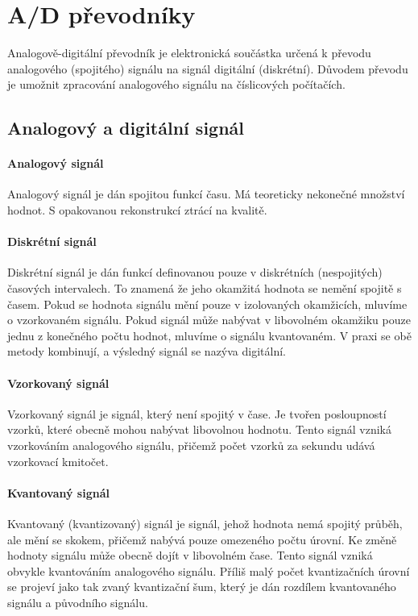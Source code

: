 
\section{A/D převodníky}
Analogově-digitální převodník je elektronická součástka určená k převodu analogového (spojitého) signálu na signál digitální (diskrétní). Důvodem převodu je umožnit zpracování analogového signálu na číslicových počítačích.

\subsection{Analogový a digitální signál}

\paragraph{Analogový signál}
Analogový signál je dán spojitou funkcí času. Má teoreticky nekonečné množství hodnot. S opakovanou rekonstrukcí ztrácí na kvalitě.

\paragraph{Diskrétní signál}
Diskrétní signál je dán funkcí definovanou pouze v diskrétních (nespojitých) časových intervalech. To znamená že jeho okamžitá hodnota se nemění spojitě s časem. Pokud se hodnota signálu mění pouze v izolovaných okamžicích, mluvíme o vzorkovaném signálu. Pokud signál může nabývat v libovolném okamžiku pouze jednu z konečného počtu hodnot, mluvíme o signálu kvantovaném. V praxi se obě metody kombinují, a výsledný signál se nazýva digitální.

\paragraph{Vzorkovaný signál}
Vzorkovaný signál je signál, který není spojitý v čase. Je tvořen posloupností vzorků, které obecně mohou nabývat libovolnou hodnotu. Tento signál vzniká vzorkováním analogového signálu, přičemž počet vzorků za sekundu udává vzorkovací kmitočet. 
\begin{figure}[htbp]
\centering

\end{figure}
\paragraph{Kvantovaný signál}
Kvantovaný (kvantizovaný) signál je signál, jehož hodnota nemá spojitý průběh, ale mění se skokem, přičemž nabývá pouze omezeného počtu úrovní. Ke změně hodnoty signálu může obecně dojít v libovolném čase. Tento signál vzniká obvykle kvantováním analogového signálu.  Příliš malý počet kvantizačních úrovní se projeví jako tak zvaný kvantizační šum, který je dán rozdílem kvantovaného signálu a původního signálu.
\begin{figure}[htbp]
\centering

\end{figure}
